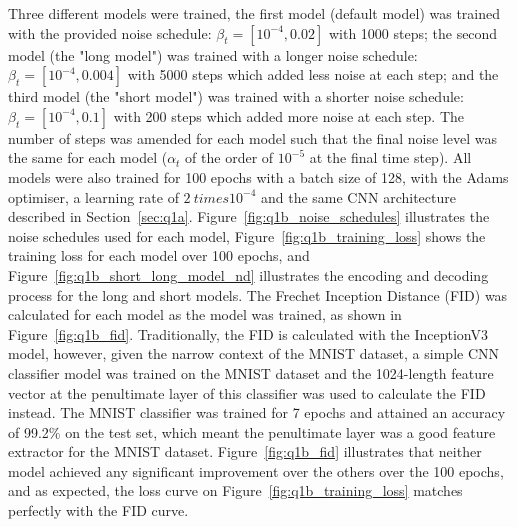 Three different models were trained, the first model (default model) was trained with the provided noise schedule:
$\beta_{t} = [10^{-4}, 0.02]$ with 1000 steps; the second model (the "long model") was trained with a longer noise schedule:
$\beta_{t} = [10^{-4}, 0.004]$ with 5000 steps which added less noise at each step; and the third model (the "short model")
was trained with a shorter noise schedule: $\beta_{t} = [10^{-4}, 0.1]$ with 200 steps which added more noise at each step.
The number of steps was amended for each model such that the final noise level was the same for each model ($\alpha_{t}$
of the order of $10^{-5}$ at the final time step).
All models were also trained for 100 epochs with a batch size of 128, with the Adams optimiser, a learning rate of
$2 \ times 10^{-4}$ and the same CNN architecture described in Section~\eqref{sec:q1a}.
Figure~\eqref{fig:q1b_noise_schedules} illustrates the noise schedules used for each model, Figure~\eqref{fig:q1b_training_loss}
shows the training loss for each model over 100 epochs, and Figure~\eqref{fig:q1b_short_long_model_nd} illustrates the encoding
and decoding process for the long and short models.
The Frechet Inception Distance (FID) was calculated for each model as the model was trained, as shown in Figure~\eqref{fig:q1b_fid}.
Traditionally, the FID is calculated with the InceptionV3 model, however, given the narrow context of the MNIST dataset,
a simple CNN classifier model was trained on the MNIST dataset and the 1024-length feature vector at
the penultimate layer of this classifier was used to calculate the FID instead.
The MNIST classifier was trained for 7 epochs and attained an accuracy of 99.2\% on the test set, which meant the penultimate
layer was a good feature extractor for the MNIST dataset.
Figure~\eqref{fig:q1b_fid} illustrates that neither model achieved any significant improvement over the others over the
100 epochs, and as expected, the loss curve on Figure~\eqref{fig:q1b_training_loss} matches perfectly with the FID curve.
